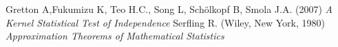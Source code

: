 \documentclass[8pt,a4paper]{article}
\theoremstyle{plain}
\theoremstyle{definition}
\theoremstyle{remark}
\begin{document}
\begin{thebibliography}{9}
 Gretton A,Fukumizu K, Teo H.C., Song L, Schölkopf B, Smola J.A.
(2007)
\textit{A Kernel Statistical Test of Independence}
 Serfling R.
(Wiley, New York, 1980)
\textit{Approximation Theorems of Mathematical Statistics}

\end{thebibliography}
\end{document}
